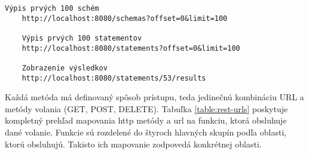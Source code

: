 	\begin{lstlisting}[label=lst:rest-api,caption=Príklad volaní REST API]
	Výpis prvých 100 schém
	http://localhost:8080/schemas?offset=0&limit=100
	
	Výpis prvých 100 statementov
	http://localhost:8080/statements?offset=0&limit=100
	
	Zobrazenie výsledkov
	http://localhost:8080/statements/53/results
	\end{lstlisting}
	
	Každá metóda má definovaný spôsob prístupu, teda jedinečnú kombináciu URL a metódy volania (GET, POST, DELETE). Tabuľka \ref{table:rest-urls} poskytuje kompletný prehľad mapovania http metódy a url na funkciu, ktorá obsluhuje dané volanie.	Funkcie sú rozdelené do štyroch hlavných skupín podľa oblasti, ktorú obsluhujú. Takisto ich mapovanie zodpovedá konkrétnej oblasti.
	

